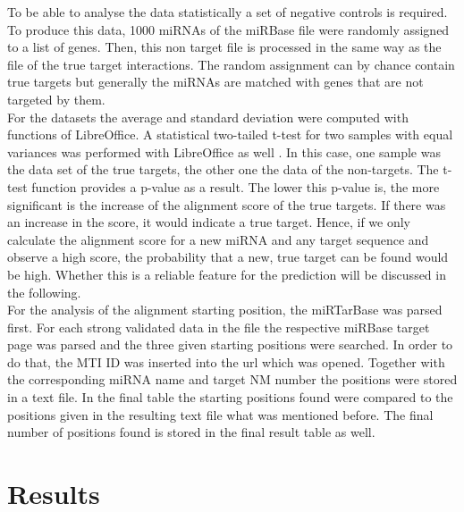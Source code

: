 \documentclass[11pt, a4paper, twoside]{book}
\begin{document}
To be able to analyse the data statistically a set of negative controls is required. To produce this data, 1000 miRNAs of the miRBase file were randomly assigned to a list of genes. Then, this non target file is processed in the same way as the file of the true target interactions. The random assignment can by chance contain true targets but generally the miRNAs are matched with genes that are not targeted by them. \\

For the datasets the average and standard deviation were computed with functions of LibreOffice. A statistical two-tailed t-test for two samples with equal variances was performed with LibreOffice as well \cite{ttest}. In this case, one sample was the data set of the true targets, the other one the data of the non-targets. The t-test function provides a p-value as a result. The lower this p-value is, the more significant is the increase of the alignment score of the true targets. If there was an increase in the score, it would indicate a true target. Hence, if we only calculate the alignment score for a new miRNA and any target sequence and observe a high score, the probability that a new, true target can be found would be high. Whether this is a reliable feature for the prediction will be discussed in the following.\\

For the analysis of the alignment starting position, the miRTarBase was parsed first. For each strong validated data in the file the respective miRBase target page was parsed and the three given starting positions were searched. In order to do that, the MTI ID was inserted into the url which was opened. Together with the corresponding miRNA name and target NM number the positions were stored in a text file. In the final table the starting positions found were compared to the positions given in the resulting text file what was mentioned before. The final number of positions found is stored in the final result table as well. 



\vspace{1cm}



\chapter{Results}
\label{chapter:results}
\end{document}
